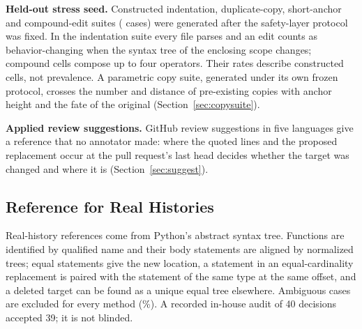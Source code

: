 \textbf{Held-out stress seed.} Constructed indentation, duplicate-copy, short-anchor and compound-edit suites (\wiFrN{} cases) were generated after the safety-layer protocol was fixed. In the indentation suite every file parses and an edit counts as behavior-changing when the syntax tree of the enclosing scope changes; compound cells compose up to four operators. Their rates describe constructed cells, not prevalence. A parametric copy suite, generated under its own frozen protocol, crosses the number and distance of pre-existing copies with anchor height and the fate of the original (Section~\ref{sec:copysuite}).

\textbf{Applied review suggestions.} GitHub review suggestions in five languages give a reference that no annotator made: where the quoted lines and the proposed replacement occur at the pull request's last head decides whether the target was changed and where it is (Section~\ref{sec:suggest}).

\subsection{Reference for Real Histories}\label{sec:oracle}
Real-history references come from Python's abstract syntax tree. Functions are identified by qualified name and their body statements are aligned by normalized trees; equal statements give the new location, a statement in an equal-cardinality replacement is paired with the statement of the same type at the same offset, and a deleted target can be found as a unique equal tree elsewhere. Ambiguous cases are excluded for every method (\rExcludedPct\%). A recorded in-house audit of 40 decisions accepted 39; it is not blinded.



